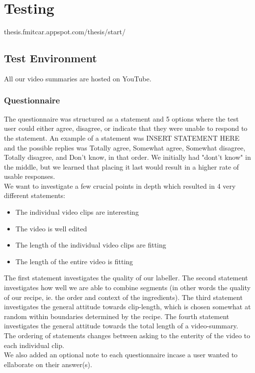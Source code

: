 %
\section{Testing}
%
thesis.fmitcar.appspot.com/thesis/start/
%
\subsection{Test Environment}
%

%
All our video summaries are hosted on YouTube.
%
\subsubsection{Questionnaire}
%
%
The questionnaire was structured as a statement and 5 options where the test user could either agree, disagree, or indicate that they were unable to respond to the statement. An example of a statement was INSERT STATEMENT HERE and the possible replies was Totally agree, Somewhat agree, Somewhat disagree, Totally disagree, and Don't know, in that order. We initially had "dont't know" in the middle, but we learned that placing it last would result in a higher rate of usable responses.\\
We want to investigate a few crucial points in depth which resulted in 4 very different statements:
%
\begin{itemize}
\item The individual video clips are interesting
\item The video is well edited
\item The length of the individual video clips are fitting
\item The length of the entire video is fitting
\end{itemize}
%
The first statement investigates the quality of our labeller. The second statement investigates how well we are able to combine segments (in other words the quality of our recipe, ie. the order and context of the ingredients). The third statement investigates the general attitude towards clip-length, which is chosen somewhat at random within boundaries determined by the recipe. The fourth statement investigates the general attitude towards the total length of a video-summary. The ordering of statements changes between asking to the enterity of the video to each individual clip.\\
We also added an optional note to each questionnaire incase a user wanted to ellaborate on their answer(s).
%
